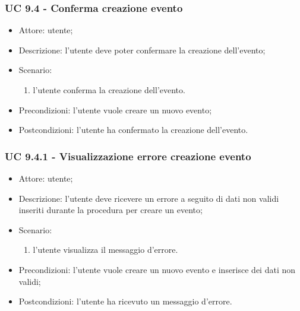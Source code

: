 \subsubsection{UC 9.4 - Conferma creazione evento} \label{sec: UC 9.4}
\begin{itemize}
    \item Attore: utente;
    \item Descrizione: l'utente deve poter confermare la creazione dell'evento;
    \item Scenario:
        \begin{enumerate}
        \item l'utente conferma la creazione dell'evento.
        \end{enumerate}
    
    \item Precondizioni: l'utente vuole creare un nuovo evento;
    \item Postcondizioni: l'utente ha confermato la creazione dell'evento.
\end{itemize}

\subsubsection{UC 9.4.1 - Visualizzazione errore creazione evento} \label{sec: UC 9.4.1}
\begin{itemize}
    \item Attore: utente;
    \item Descrizione: l'utente deve ricevere un errore a seguito di dati non validi inseriti durante la procedura per creare un evento;
    \item Scenario:
        \begin{enumerate}
        \item l'utente visualizza il messaggio d'errore.
        \end{enumerate}
    
    \item Precondizioni: l'utente vuole creare un nuovo evento e inserisce dei dati non validi;
    \item Postcondizioni: l'utente ha ricevuto un messaggio d'errore.
\end{itemize}




